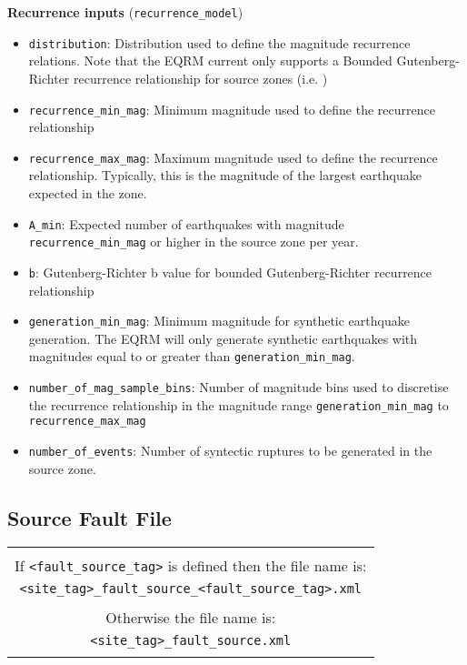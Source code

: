 \textbf{Recurrence inputs} (\texttt{recurrence\_model})
\begin{itemize}
\item \texttt{distribution}: Distribution used to define the magnitude recurrence relations. Note that
the EQRM current only supports a Bounded Gutenberg-Richter recurrence
relationship for source zones (i.e.
)
\item \texttt{recurrence\_min\_mag}: Minimum magnitude used to
define the recurrence relationship
\item \texttt{recurrence\_max\_mag}: Maximum magnitude used to
define the recurrence relationship. Typically, this is the magnitude
of the largest earthquake expected in the zone.
\item \texttt{A\_min}: Expected number of earthquakes with magnitude \texttt{recurrence\_min\_mag}
or higher in the source zone per year.
\item \texttt{b}: Gutenberg-Richter b value for bounded Gutenberg-Richter recurrence
relationship
\item \texttt{generation\_min\_mag}: Minimum magnitude for synthetic
earthquake generation. The EQRM will only generate synthetic
earthquakes with magnitudes equal to or greater than
\texttt{generation\_min\_mag}.
\item \texttt{number\_of\_mag\_sample\_bins}: Number of magnitude
bins used to discretise the recurrence relationship in the magnitude
range \texttt{generation\_min\_mag} to
\texttt{recurrence\_max\_mag}
\item \texttt{number\_of\_events}: Number of syntectic ruptures to
be generated in the source zone.
\end{itemize}

\subsection{Source Fault File}

\begin{center}
\begin{tabular}{|c|}
\hline
 \\
 If \texttt{<fault\_source\_tag>} is defined then the file name is:\\
\texttt{<site\_tag>\_}\texttt{fault\_source\_}\texttt{<fault\_source\_tag>}\texttt{.xml}
\\
\\
Otherwise the file name is:\\
\texttt{<site\_tag>\_}\texttt{fault\_source}\texttt{.xml}\\
\\
\hline
\end{tabular}
\end{center}


